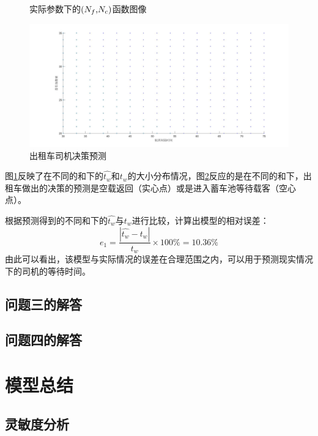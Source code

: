 \documentclass{cumcm}
\begin{document}
\begin{enumerate}[(1)]
\begin{figure}[H]
		\caption{实际参数下的\waittime$(\mbox{$N_f$,$N_c$})$函数图像}
		\label{fi:problem2func}
	\end{figure}
	\begin{figure}[H]   
		\centering   
		\includegraphics[width=1.0\textwidth]{img/problem2_pred.jpg}   
		\caption{出租车司机决策预测}   
		\label{fi:problem2pred}    
	\end{figure}
	图\ref{fi:problem2func}反映了在不同的\flightnum 和\taxinum 下的$\hat{t_w}$和$t_w$的大小分布情况，图\ref{fi:problem2pred}反应的是在不同的\flightnum 和\taxinum 下，出租车做出的决策的预测是空载返回（实心点）或是进入蓄车池等待载客（空心点）。\par
	根据预测得到的不同\flightnum 和\taxinum 下的$\hat{t_w}$与$t_w$进行比较，计算出模型的相对误差：
	\begin{equation}
		e_1=\frac{\left| \hat{t_w}-t_w\right| }{t_w}\times100\%=10.36\%
	\end{equation}
	由此可以看出，该模型与实际情况的误差在合理范围之内，可以用于预测现实情况下的司机的等待时间。	
\end{enumerate}

\subsection{问题三的解答}

\subsection{问题四的解答}

\section{模型总结}
\subsection{灵敏度分析}
\end{document}
